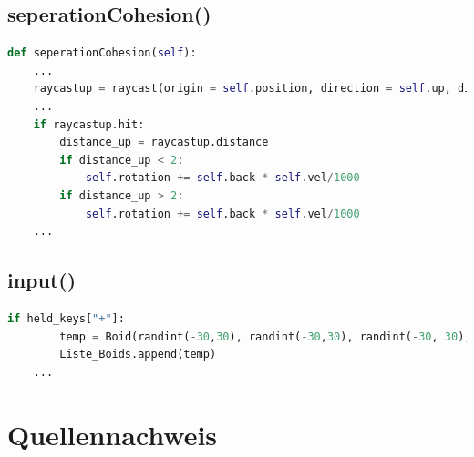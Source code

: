 \documentclass[a4paper, hidelinks, 12pt]{article}
\begin{document}
\subsection{seperationCohesion()}\label{CodeseperationCohesion}
\begin{lstlisting}[style=mystyle, language=Python]
def seperationCohesion(self):
	...
	raycastup = raycast(origin = self.position, direction = self.up, distance = 5, traverse_target = scene, ignore = (Wireframe,))
	...
	if raycastup.hit:
		distance_up = raycastup.distance
		if distance_up < 2:
			self.rotation += self.back * self.vel/1000
		if distance_up > 2:
			self.rotation += self.back * self.vel/1000
	...
\end{lstlisting}
\newpage
\subsection{input()}\label{Codeinput}
\begin{lstlisting}[style=mystyle, language=Python]
	if held_keys["+"]:
		temp = Boid(randint(-30,30), randint(-30,30), randint(-30, 30), randint(0,360), randint(0,360), randint(0,360), uniform(50.0, 300.0), uniform(0.0, 10.0), 300.0, 1, groesse)
		Liste_Boids.append(temp)
	...
\end{lstlisting}
\newpage

\section{Quellennachweis}
\tiny
\newpage
\end{document}
